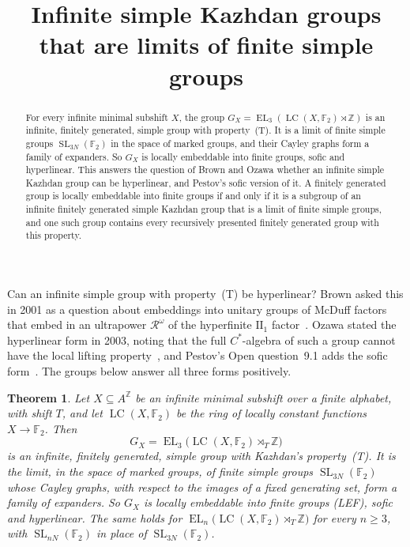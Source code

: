 \documentclass[11pt]{amsart}
\newtheorem{theorem}{Theorem}
\newcommand{\F}{\mathbb F}
\newcommand{\Z}{\mathbb Z}
\newcommand{\LC}{\operatorname{LC}}
\newcommand{\EL}{\operatorname{EL}}
\newcommand{\SL}{\operatorname{SL}}
\begin{document}
\title{Infinite simple Kazhdan groups that are limits of finite simple groups}
\author{\paperauthorname}
\date{}

\begin{abstract}
For every infinite minimal subshift $X$, the group
$G_X=\EL_3(\LC(X,\F_2)\rtimes\Z)$ is an infinite, finitely generated,
simple group with property~\textup{(T)}. It is a limit of finite simple
groups $\SL_{3N}(\F_2)$ in the space of marked groups, and their Cayley
graphs form a family of expanders. So $G_X$ is locally embeddable into
finite groups, sofic and hyperlinear. This answers the question of Brown
and Ozawa whether an infinite simple Kazhdan group can be hyperlinear,
and Pestov's sofic version of it. A finitely generated group is locally
embeddable into finite groups if and only if it is a subgroup of an
infinite finitely generated simple Kazhdan group that is a limit of
finite simple groups, and one such group contains every recursively
presented finitely generated group with this property.
\end{abstract}
\maketitle

Can an infinite simple group with property~\textup{(T)} be hyperlinear?
Brown asked this in 2001 as a question about embeddings into unitary
groups of McDuff factors that embed in an ultrapower $\mathcal R^\omega$
of the hyperfinite $\mathrm{II}_1$ factor~\cite[\S11, Question~7]{Brown}.
Ozawa stated the hyperlinear form in 2003, noting that the full
$C^*$-algebra of such a group cannot have the local lifting
property~\cite[p.~527]{Ozawa}, and Pestov's Open question~9.1 adds the
sofic form~\cite{Pestov}. The groups below answer all three forms
positively.

\begin{theorem}\label{thm:main}
Let $X\subseteq A^{\Z}$ be an infinite minimal subshift over a finite
alphabet, with shift $T$, and let $\LC(X,\F_2)$ be the ring of locally
constant functions $X\to\F_2$. Then
\[
  G_X=\EL_3\bigl(\LC(X,\F_2)\rtimes_T\Z\bigr)
\]
is an infinite, finitely generated, simple group with Kazhdan's
property~\textup{(T)}. It is the limit, in the space of marked groups, of
finite simple groups $\SL_{3N}(\F_2)$ whose Cayley graphs, with respect to
the images of a fixed generating set, form a family of expanders. So $G_X$
is locally embeddable into finite groups \textup{(LEF)}, sofic and
hyperlinear. The same holds for $\EL_n\bigl(\LC(X,\F_2)\rtimes_T\Z\bigr)$
for every $n\ge3$, with $\SL_{nN}(\F_2)$ in place of $\SL_{3N}(\F_2)$.
\end{theorem}
\end{document}
